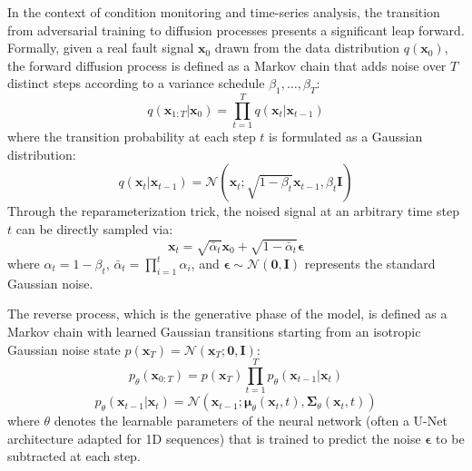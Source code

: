 In the context of condition monitoring and time-series analysis, the transition from adversarial training to diffusion processes presents a significant leap forward. Formally, given a real fault signal $\mathbf{x}_0$ drawn from the data distribution $q(\mathbf{x}_0)$, the forward diffusion process is defined as a Markov chain that adds noise over $T$ distinct steps according to a variance schedule $\beta_1, \dots, \beta_T$:
\begin{equation}
\label{eq:forward_diffusion}
q(\mathbf{x}_{1:T} | \mathbf{x}_0) = \prod_{t=1}^{T} q(\mathbf{x}_t | \mathbf{x}_{t-1})
\end{equation}
where the transition probability at each step $t$ is formulated as a Gaussian distribution:
\begin{equation}
\label{eq:forward_transition}
q(\mathbf{x}_t | \mathbf{x}_{t-1}) = \mathcal{N}\left(\mathbf{x}_t; \sqrt{1 - \beta_t} \mathbf{x}_{t-1}, \beta_t \mathbf{I}\right)
\end{equation}
Through the reparameterization trick, the noised signal at an arbitrary time step $t$ can be directly sampled via:
\begin{equation}
\label{eq:reparameterization}
\mathbf{x}_t = \sqrt{\bar{\alpha}_t}\mathbf{x}_0 + \sqrt{1 - \bar{\alpha}_t}\bm{\epsilon}
\end{equation}
where $\alpha_t = 1 - \beta_t$, $\bar{\alpha}_t = \prod_{i=1}^t \alpha_i$, and $\bm{\epsilon} \sim \mathcal{N}(\mathbf{0}, \mathbf{I})$ represents the standard Gaussian noise.

The reverse process, which is the generative phase of the model, is defined as a Markov chain with learned Gaussian transitions starting from an isotropic Gaussian noise state $p(\mathbf{x}_T) = \mathcal{N}(\mathbf{x}_T; \mathbf{0}, \mathbf{I})$:
\begin{equation}
\label{eq:reverse_process}
p_\theta(\mathbf{x}_{0:T}) = p(\mathbf{x}_T) \prod_{t=1}^{T} p_\theta(\mathbf{x}_{t-1} | \mathbf{x}_t)
\end{equation}
\begin{equation}
\label{eq:reverse_transition}
p_\theta(\mathbf{x}_{t-1} | \mathbf{x}_t) = \mathcal{N}\left(\mathbf{x}_{t-1}; \bm{\mu}_\theta(\mathbf{x}_t, t), \mathbf{\Sigma}_\theta(\mathbf{x}_t, t)\right)
\end{equation}
where $\theta$ denotes the learnable parameters of the neural network \cite{he2016deep} (often a U-Net architecture adapted for 1D sequences) that is trained to predict the noise $\bm{\epsilon}$ to be subtracted at each step.

